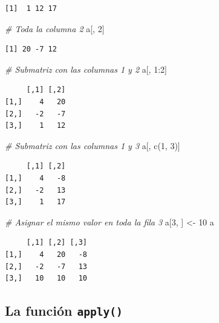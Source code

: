 \documentclass[
]{book}
\newenvironment{Shaded}{\begin{snugshade}}{\end{snugshade}}
\newcommand{\CommentTok}[1]{\textcolor[rgb]{0.56,0.35,0.01}{\textit{#1}}}
\newcommand{\DecValTok}[1]{\textcolor[rgb]{0.00,0.00,0.81}{#1}}
\newcommand{\FunctionTok}[1]{\textcolor[rgb]{0.00,0.00,0.00}{#1}}
\newcommand{\NormalTok}[1]{#1}
\newcommand{\OtherTok}[1]{\textcolor[rgb]{0.56,0.35,0.01}{#1}}
\newcommand{\SpecialCharTok}[1]{\textcolor[rgb]{0.00,0.00,0.00}{#1}}
\begin{document}
\begin{verbatim}
[1]  1 12 17
\end{verbatim}

\begin{Shaded}
\begin{Highlighting}[]
\CommentTok{\# Toda la columna 2}
\NormalTok{a[, }\DecValTok{2}\NormalTok{]}
\end{Highlighting}
\end{Shaded}

\begin{verbatim}
[1] 20 -7 12
\end{verbatim}

\begin{Shaded}
\begin{Highlighting}[]
\CommentTok{\# Submatriz con las columnas 1 y 2}
\NormalTok{a[, }\DecValTok{1}\SpecialCharTok{:}\DecValTok{2}\NormalTok{]}
\end{Highlighting}
\end{Shaded}

\begin{verbatim}
     [,1] [,2]
[1,]    4   20
[2,]   -2   -7
[3,]    1   12
\end{verbatim}

\begin{Shaded}
\begin{Highlighting}[]
\CommentTok{\# Submatriz con las columnas 1 y 3}
\NormalTok{a[, }\FunctionTok{c}\NormalTok{(}\DecValTok{1}\NormalTok{, }\DecValTok{3}\NormalTok{)]}
\end{Highlighting}
\end{Shaded}

\begin{verbatim}
     [,1] [,2]
[1,]    4   -8
[2,]   -2   13
[3,]    1   17
\end{verbatim}

\begin{Shaded}
\begin{Highlighting}[]
\CommentTok{\# Asignar el mismo valor en toda la fila 3}
\NormalTok{a[}\DecValTok{3}\NormalTok{, ] }\OtherTok{\textless{}{-}} \DecValTok{10}
\NormalTok{a}
\end{Highlighting}
\end{Shaded}

\begin{verbatim}
     [,1] [,2] [,3]
[1,]    4   20   -8
[2,]   -2   -7   13
[3,]   10   10   10
\end{verbatim}

\hypertarget{la-funciuxf3n-apply}{%
\subsection{\texorpdfstring{La función \texttt{apply()}}{La función apply()}}\label{la-funciuxf3n-apply}}
\end{document}
